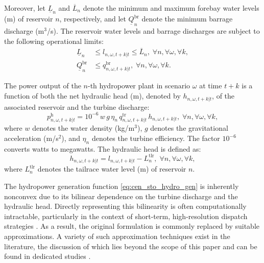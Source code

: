 \documentclass[a4paper,fleqn]{cas-sc}
\begin{document}
Moreover, let $\underline{L}_n$ and $\overline{L}_n$ denote the minimum and maximum forebay water levels (m) of reservoir $n$, respectively,
and let $\underline{Q}^{\mathrm{br}}_n$ denote the minimum barrage discharge (m$^3$/s).
The reservoir water levels and barrage discharges are subject to the following operational limits:
\begin{align}
    \underline{L}_{n} & \leq l_{n, \omega, t+k | t} \leq \overline{L}_{n}, \; \forall n, \forall \omega, \forall k, \label{eq:cen_sto_wl_lim}\\
    \underline{Q}^{\mathrm{br}}_{n} & \leq q^{\mathrm{br}}_{n, \omega, t+k | t}, \; \forall n, \forall \omega, \forall k. \label{eq:cen_sto_br_lim}
\end{align}

The power output of the $n$-th hydropower plant in scenario $\omega$ at time $t+k$ is a function of both the net hydraulic head (m), denoted by $h_{n,\omega,t+k|t}$, of the associated reservoir and the turbine discharge:
\begin{equation}
\label{eq:cen_sto_hydro_gen}
    p^{\mathrm{h}}_{n,\omega,t+k|t} = 10^{-6} \, w \, g \, \eta_n \, q^{\mathrm{tr}}_{n, \omega, t+k|t} \, h_{n, \omega, t+k|t}, \; \forall n, \forall \omega, \forall k,
\end{equation}
where $w$ denotes the water density (kg/m$^3$), $g$ denotes the gravitational acceleration (m/s$^2$), and $\eta_n$ denotes the turbine efficiency.
The factor $10^{-6}$ converts watts to megawatts.
The hydraulic head is defined as:
\begin{equation}
\label{eq:cen_sto_head}
    h_{n, \omega, t+k|t} = l_{n, \omega, t+k|t} - L^{\mathrm{tlr}}_{n}, \; \forall n, \forall \omega, \forall k,
\end{equation}
where $L^{\mathrm{tlr}}_n$ denotes the tailrace water level (m) of reservoir $n$.

The hydropower generation function \eqref{eq:cen_sto_hydro_gen} is inherently nonconvex due to its bilinear dependence on the turbine discharge and the hydraulic head.
Directly representing this bilinearity is often computationally intractable, particularly in the context of short-term, high-resolution dispatch strategies \citep{zhang2022chance}. 
As a result, the original formulation is commonly replaced by suitable approximations.
A variety of such approximation techniques exist in the literature,
the discussion of which lies beyond the scope of this paper and can be found in dedicated studies \citep{santos2022piecewise}.
\end{document}
